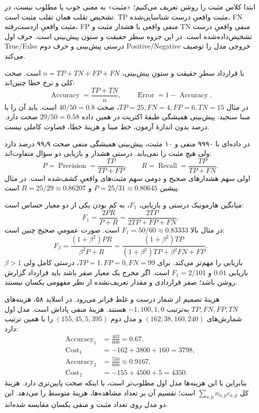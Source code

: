 ابتدا کلاس مثبت را روشن تعریف می‌کنیم؛ «مثبت» به معنی خوب یا مطلوب نیست، در تشخیص تقلب همان تقلب مثبت است. TP مثبت واقعیِ درست شناسایی‌شده، FN مثبت واقعیِ ازدست‌رفته، FP منفی واقعی با هشدار مثبت و TN منفی واقعیِ درست تشخیص‌داده‌شده است. در این جزوه سطر حقیقت و ستون پیش‌بینی است. حرف اول True/False درستی پیش‌بینی و حرف دوم Positive/Negative خروجی مدل را توصیف می‌کند.

با قرارداد سطرِ حقیقت و ستونِ پیش‌بینی، $n=TP+TN+FP+FN$ است. صحت کلی و نرخ خطا چنین‌اند:
\[\operatorname{Accuracy}=\frac{TP+TN}{n},\qquad \operatorname{Error}=1-\operatorname{Accuracy}.\]
در مثال $TP=25,FN=4,FP=6,TN=15$، صحت $40/50=0.8$ است. باید آن را با مبنا سنجید: پیش‌بینی همیشگی طبقهٔ اکثریت در همین داده $29/50=0.58$ صحت دارد. درصد بدون اندازهٔ آزمون، خط مبنا و هزینهٔ خطا، قضاوت کاملی نیست.

در داده‌ای با ۹۹۹۰ منفی و ۱۰ مثبت، پیش‌بینی همیشگی منفی صحت ۹۹٫۹ درصد دارد ولی هیچ مثبت را نمی‌یابد. درستی هشدار و بازیابی دو سؤال متفاوت‌اند:
\[P=\operatorname{Precision}=\frac{TP}{TP+FP},\qquad R=\operatorname{Recall}=\frac{TP}{TP+FN}.\]
اولی سهم هشدارهای صحیح و دومی سهم مثبت‌های واقعیِ کشف‌شده است. در مثال پیشین $P=25/31\approx0.80645$ و $R=25/29\approx0.86207$ است.

میانگین هارمونیک درستی و بازیابی، $F_1$، به کم بودن یکی از دو معیار حساس است:
\[F_1=\frac{2PR}{P+R}=\frac{2TP}{2TP+FP+FN}.\]
در مثال بالا $F_1=50/60\approx0.83333$ است. صورت عمومیِ صحیح چنین است:
\[F_\beta=\frac{(1+\beta^2)PR}{\beta^2P+R}=\frac{(1+\beta^2)TP}{(1+\beta^2)TP+\beta^2FN+FP}.\]
$\beta>1$ بازیابی را مهم‌تر می‌کند. برای $TP=1,FP=0,FN=99$، درستی کامل ولی بازیابی $0.01$ و $F_1=2/101$ است. اگر مخرج یک معیار صفر باشد باید قرارداد گزارش روشن باشد؛ صفر قراردادی و مقدار تعریف‌نشده از نظر مفهومی یکسان نیستند.

هزینهٔ تصمیم از شمار درست و غلط فراتر می‌رود. در اسلاید ۵۸، هزینه‌های $TP,FN,FP,TN$ به‌ترتیب $-1,100,1,0$ هستند. هزینهٔ منفی پاداش است. مدل اول شمارش‌های $(162,38,160,240)$ و مدل دوم $(155,45,5,395)$ را با همین ترتیب دارد:
\begin{align*}
\operatorname{Accuracy}_1&=\frac{402}{600}=0.67,\\
\operatorname{Cost}_1&=-162+3800+160=3798,\\
\operatorname{Accuracy}_2&=\frac{550}{600}\approx0.9167,\\
\operatorname{Cost}_2&=-155+4500+5=4350.
\end{align*}
بنابراین با این هزینه‌ها مدل اول مطلوب‌تر است، با اینکه صحت پایین‌تری دارد. هزینهٔ کل $\sum_{a,p}n_{a,p}c_{a,p}$ است؛ تقسیم آن بر تعداد مشاهده‌ها، هزینهٔ متوسط را می‌دهد. این دو مدل روی تعداد مثبت و منفی یکسان مقایسه شده‌اند.

